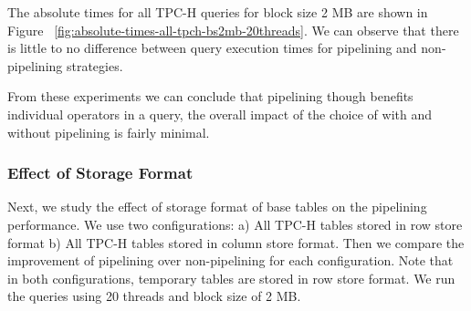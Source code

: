 The absolute times for all TPC-H queries for block size 2 MB are shown in Figure ~\ref{fig:absolute-times-all-tpch-bs2mb-20threads}.
We can observe that there is little to no difference between query execution times for pipelining and non-pipelining strategies. 

From these experiments we can conclude that pipelining though benefits individual operators in a query, the overall impact of the choice of with and without pipelining is fairly minimal.

\subsubsection{Effect of Storage Format}
Next, we study the effect of storage format of base tables on the pipelining performance. 
We use two configurations: a) All TPC-H tables stored in row store format b) All TPC-H tables stored in column store format. 
Then we compare the improvement of pipelining over non-pipelining for each configuration. 
Note that in both configurations, temporary tables are stored in row store format. 
We run the queries using 20 threads and block size of 2 MB.

